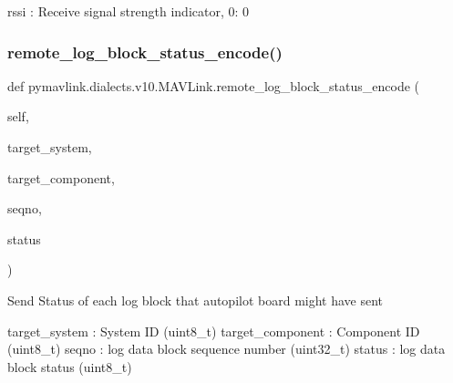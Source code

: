 \begin{DoxyVerb}
\begin{DoxyVerb}
\begin{DoxyVerb}
\begin{DoxyVerb}
\begin{DoxyVerb}
\begin{DoxyVerb}
\begin{DoxyVerb}
\begin{DoxyVerb}
\begin{DoxyVerb}
\begin{DoxyVerb}
rssi                      : Receive signal strength indicator, 0: 0%
 \mbox{\label{classpymavlink_1_1dialects_1_1v10_1_1MAVLink_a9412e4d41384ea295826e8086156f5c4}} 
\subsubsection{\texorpdfstring{remote\+\_\+log\+\_\+block\+\_\+status\+\_\+encode()}{remote\_log\_block\_status\_encode()}}
{\footnotesize\ttfamily def pymavlink.\+dialects.\+v10.\+M\+A\+V\+Link.\+remote\+\_\+log\+\_\+block\+\_\+status\+\_\+encode (\begin{DoxyParamCaption}\item[{}]{self,  }\item[{}]{target\+\_\+system,  }\item[{}]{target\+\_\+component,  }\item[{}]{seqno,  }\item[{}]{status }\end{DoxyParamCaption})}

\begin{DoxyVerb}Send Status of each log block that autopilot board might have sent

target_system             : System ID (uint8_t)
target_component          : Component ID (uint8_t)
seqno                     : log data block sequence number (uint32_t)
status                    : log data block status (uint8_t)\end{DoxyVerb}
 \mbox{\label{classpymavlink_1_1dialects_1_1v10_1_1MAVLink_ace5e839951feb51db7520922eb0700c9}} 

\end{DoxyVerb}
\end{DoxyVerb}
\end{DoxyVerb}
\end{DoxyVerb}
\end{DoxyVerb}
\end{DoxyVerb}
\end{DoxyVerb}
\end{DoxyVerb}
\end{DoxyVerb}
\end{DoxyVerb}
